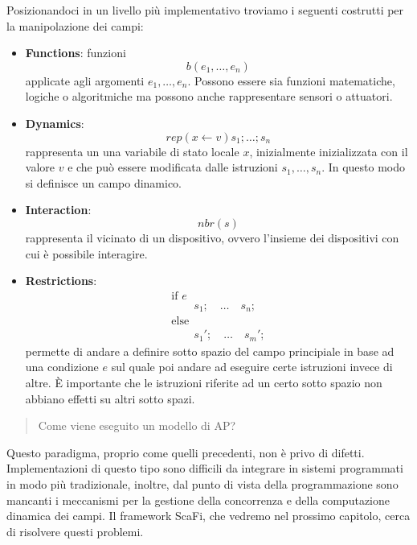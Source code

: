 \documentclass[12pt,a4paper,openright,twoside]{book}
\begin{document}
Posizionandoci in un livello più implementativo troviamo i seguenti costrutti per la manipolazione dei campi: 

\begin{itemize}
    \item \textbf{Functions}: funzioni $$ b(e_1,\dots,e_n) $$ applicate agli argomenti $e_1,\dots,e_n$. Possono essere sia funzioni matematiche, logiche o algoritmiche ma possono anche rappresentare sensori o attuatori.
    \item \textbf{Dynamics}: $$ rep(x \leftarrow v){s_1;\dots;s_n} $$ rappresenta un una variabile di stato locale $x$, inizialmente inizializzata con il valore $v$ e che può essere modificata dalle istruzioni $s_1,\dots,s_n$. In questo modo si definisce un campo dinamico.
    \item \textbf{Interaction}: $$ nbr(s) $$ rappresenta il vicinato di un dispositivo, ovvero l'insieme dei dispositivi con cui è possibile interagire.
    \item \textbf{Restrictions}: $$
        \begin{array}{l}
        \text{if } e \\
        \qquad s_1; \quad \dots \quad s_n; \\
        \text{else} \\
        \qquad s_1'; \quad \dots \quad s_m';
        \end{array}
    $$
    permette di andare a definire sotto spazio del campo principiale in base ad una condizione $e$ sul quale poi andare ad eseguire certe istruzioni invece di altre. È importante che le istruzioni riferite ad un certo sotto spazio non abbiano effetti su altri sotto spazi.
\end{itemize}

\begin{quote}
    \centering
    Come viene eseguito un modello di \ac{AP}?
\end{quote}

Questo paradigma, proprio come quelli precedenti, non è privo di difetti. 
Implementazioni di questo tipo sono difficili da integrare in sistemi programmati in modo più tradizionale, inoltre, dal punto di vista della programmazione sono mancanti i meccanismi per la gestione della concorrenza e della computazione dinamica dei campi. Il framework ScaFi, che vedremo nel prossimo capitolo, cerca di risolvere questi problemi.

\end{document}
